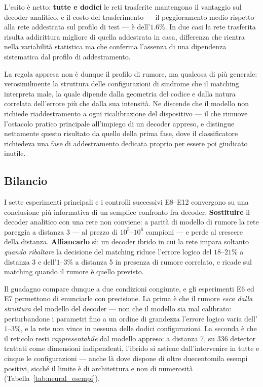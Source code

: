 L'esito è netto: \textbf{tutte e dodici} le reti trasferite mantengono il vantaggio sul decoder analitico, e il costo del trasferimento --- il peggioramento medio rispetto alla rete addestrata sul profilo di test --- è dell'$1.6\%$. In due casi la rete trasferita risulta addirittura migliore di quella addestrata in casa, differenza che rientra nella variabilità statistica ma che conferma l'assenza di una dipendenza sistematica dal profilo di addestramento.

La regola appresa non è dunque il profilo di rumore, ma qualcosa di più generale: verosimilmente la struttura delle configurazioni di sindrome che il matching interpreta male, la quale dipende dalla geometria del codice e dalla natura correlata dell'errore più che dalla sua intensità. Ne discende che il modello non richiede riaddestramento a ogni ricalibrazione del dispositivo --- il che rimuove l'ostacolo pratico principale all'impiego di un decoder appreso, e distingue nettamente questo risultato da quello della prima fase, dove il classificatore richiedeva una fase di addestramento dedicata proprio per essere poi giudicato inutile.

\subsection{Bilancio}
\label{subsec:neural_bilancio}

I sette esperimenti principali e i controlli successivi E8--E12 convergono
su una conclusione più informativa di un semplice confronto fra decoder.
\textbf{Sostituire} il decoder analitico con una rete non conviene: a
parità di modello di rumore la rete pareggia a distanza 3 --- al prezzo
di $10^5$--$10^6$ campioni --- e perde al crescere della distanza.
\textbf{Affiancarlo} sì: un decoder ibrido in cui la rete impara soltanto
\emph{quando ribaltare} la decisione del matching riduce l'errore logico
del $18$--$21\%$ a distanza 3 e dell'$1$--$3\%$ a distanza 5 in
presenza di rumore correlato, e ricade sul matching quando il rumore è
quello previsto.

Il guadagno compare dunque a due condizioni congiunte, e gli esperimenti E6 ed E7 permettono di enunciarle con precisione. La prima è che il rumore \emph{esca dalla struttura} del modello del decoder --- non che il modello sia mal calibrato: perturbandone i parametri fino a un ordine di grandezza l'errore logico varia dell'$1$--$3\%$, e la rete non vince in nessuna delle dodici configurazioni. La seconda è che il reticolo resti \emph{rappresentabile} dal modello appreso: a distanza 7, su $336$ detector trattati come dimensioni indipendenti, l'ibrido si astiene dall'intervenire in tutte e cinque le configurazioni --- anche là dove dispone di oltre duecentomila esempi positivi, sicché il limite è di architettura e non di numerosità (Tabella~\ref{tab:neural_esempi}).

